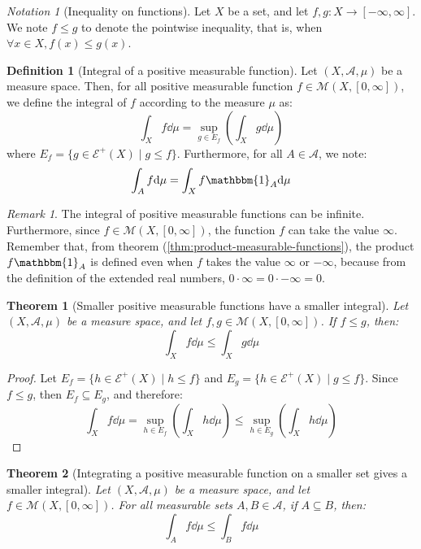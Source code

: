 \documentclass{article}
\newtheorem{theorem}{Theorem}[section]
\theoremstyle{definition}
\newtheorem{definition}{Definition}[section]
\theoremstyle{remark}
\newtheorem*{remark}{Remark}
\theoremstyle{example}
\theoremstyle{notation}
\newtheorem{notation}{Notation}[section]
\begin{document}
\begin{notation}[Inequality on functions]
		Let $X$ be a set, and let $f, g : X \rightarrow [-\infty, \infty]$. We note $f \leq g$ to denote the pointwise inequality, that is, when $\forall x \in X, f(x) \leq g(x)$.
\end{notation}

\begin{definition}[Integral of a positive measurable function] %
		Let $(X, \mathcal{A}, \mu)$ be a measure space. Then, for all positive measurable function $f \in \mathcal{M}(X, [0, \infty])$, we define the integral of $f$ according to the measure $\mu$ as:
				$$\int_X f \dd \mu = \sup_{g \in E_f} \left(\int_X g \dd \mu\right)$$
		where $E_f = \{g \in \mathcal{E}^+(X) \mid g \leq f\}$. Furthermore, for all $A \in \mathcal{A}$, we note:
				$$\int_A f \dd \mu = \int_X f \mathbbm{1}_A \dd \mu$$
\end{definition}

\begin{remark}
		The integral of positive measurable functions can be infinite. Furthermore, since $f \in \mathcal{M}(X, [0, \infty])$, the function $f$ can take the value $\infty$. Remember that, from theorem (\ref{thm:product-measurable-functions}), the product $f \mathbbm{1}_A$ is defined even when $f$ takes the value $\infty$ or $-\infty$, because from the definition of the extended real numbers, $0 \cdot \infty = 0 \cdot -\infty = 0$.
\end{remark}

\begin{theorem}[Smaller positive measurable functions have a smaller integral] \label{thm:smaller-positive-measurable-functions-smaller-integral}
		Let $(X, \mathcal{A}, \mu)$ be a measure space, and let $f, g \in \mathcal{M}(X, [0, \infty])$. If $f \leq g$, then:
				$$\int_X f \dd \mu \leq \int_X g \dd \mu$$
\end{theorem}

\begin{proof}
		Let $E_f = \{h \in \mathcal{E}^+(X) \mid h \leq f\}$ and $E_g = \{h \in \mathcal{E}^+(X) \mid g \leq f\}$. Since $f \leq g$, then $E_f \subseteq E_g$, and therefore:
		$$\int_X f \dd \mu = \sup_{h \in E_f} \left(\int_X h \dd \mu\right) \leq \sup_{h \in E_g} \left(\int_X h \dd \mu\right)$$
\end{proof}

\begin{theorem}[Integrating a positive measurable function on a smaller set gives a smaller integral]
		Let $(X, \mathcal{A}, \mu)$ be a measure space, and let $f \in \mathcal{M}(X, [0, \infty])$. For all measurable sets $A, B \in \mathcal{A}$, if $A \subseteq B$, then:
				$$\int_A f \dd \mu \leq \int_B f \dd \mu$$
\end{theorem}
\end{document}
